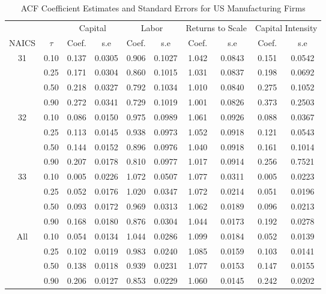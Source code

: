 \begin{table}[ht]
\centering
\caption{ACF Coefficient Estimates and Standard Errors for US Manufacturing Firms} 
\begin{tabular}{cccccccccc}
  \hline\hline & & \multicolumn{2}{c}{Capital}  & \multicolumn{2}{c}{Labor} & \multicolumn{2}{c}{Returns to Scale} & \multicolumn{2}{c}{Capital Intensity}\\ \cmidrule(lr){3-4} \cmidrule(lr){5-6} \cmidrule(lr){7-8} \cmidrule(lr){9-10}NAICS & $\tau$ & Coef. & s.e & Coef. & s.e & Coef. & s.e & Coef. & s.e \\ 
  \hline
31 & 0.10 & 0.137 & 0.0305 & 0.906 & 0.1027 & 1.042 & 0.0843 & 0.151 & 0.0542 \\ 
   & 0.25 & 0.171 & 0.0304 & 0.860 & 0.1015 & 1.031 & 0.0837 & 0.198 & 0.0692 \\ 
   & 0.50 & 0.218 & 0.0327 & 0.792 & 0.1034 & 1.010 & 0.0840 & 0.275 & 0.1052 \\ 
   & 0.90 & 0.272 & 0.0341 & 0.729 & 0.1019 & 1.001 & 0.0826 & 0.373 & 0.2503 \\ 
  32 & 0.10 & 0.086 & 0.0150 & 0.975 & 0.0989 & 1.061 & 0.0926 & 0.088 & 0.0367 \\ 
   & 0.25 & 0.113 & 0.0145 & 0.938 & 0.0973 & 1.052 & 0.0918 & 0.121 & 0.0543 \\ 
   & 0.50 & 0.144 & 0.0152 & 0.896 & 0.0976 & 1.040 & 0.0918 & 0.161 & 0.1014 \\ 
   & 0.90 & 0.207 & 0.0178 & 0.810 & 0.0977 & 1.017 & 0.0914 & 0.256 & 0.7521 \\ 
  33 & 0.10 & 0.005 & 0.0226 & 1.072 & 0.0507 & 1.077 & 0.0311 & 0.005 & 0.0223 \\ 
   & 0.25 & 0.052 & 0.0176 & 1.020 & 0.0347 & 1.072 & 0.0214 & 0.051 & 0.0196 \\ 
   & 0.50 & 0.093 & 0.0172 & 0.969 & 0.0313 & 1.062 & 0.0189 & 0.096 & 0.0213 \\ 
   & 0.90 & 0.168 & 0.0180 & 0.876 & 0.0304 & 1.044 & 0.0173 & 0.192 & 0.0278 \\ 
  All & 0.10 & 0.054 & 0.0134 & 1.044 & 0.0286 & 1.099 & 0.0184 & 0.052 & 0.0139 \\ 
   & 0.25 & 0.102 & 0.0119 & 0.983 & 0.0240 & 1.085 & 0.0159 & 0.103 & 0.0141 \\ 
   & 0.50 & 0.138 & 0.0118 & 0.939 & 0.0231 & 1.077 & 0.0153 & 0.147 & 0.0155 \\ 
   & 0.90 & 0.206 & 0.0127 & 0.853 & 0.0229 & 1.060 & 0.0145 & 0.242 & 0.0202 \\ 
   \hline
\end{tabular}
\end{table}
